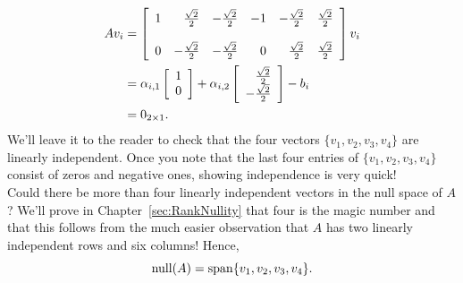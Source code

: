      $$\begin{aligned} A v_i & =  \left[\begin{array}{rrrrrr}  1 & \frac{\sqrt{2}}{2} & -\frac{\sqrt{2}}{2} & -1 & -\frac{\sqrt{2}}{2} & \frac{\sqrt{2}}{2} \bigskip \\
     0& -\frac{\sqrt{2}}{2} & -\frac{\sqrt{2}}{2} & 0 & \frac{\sqrt{2}}{2} & \frac{\sqrt{2}}{2}\end{array} \right] v_i\\
     & =\alpha_{i,1} \left[\begin{array}{r}  1\\ 0 \end{array} \right] + \alpha_{i,2} \left[\begin{array}{r}  \frac{\sqrt{2}}{2}\\ -\frac{\sqrt{2}}{2} \end{array} \right] - b_i \\
     & = 0_{2 \times 1}. \end{aligned}  $$
     We'll leave it to the reader to check that the four vectors $\{v_1, v_2, v_3, v_4\}$ are linearly independent. Once you note that the last four entries of $\{v_1, v_2, v_3, v_4 \}$ consist of zeros and negative ones, showing independence is very quick!\\
     
Could there be more than four linearly independent vectors in the null space of $A$? We'll prove in Chapter~\ref{sec:RankNullity} that four is the magic number and that this follows from the much easier observation that $A$ has two linearly independent rows and six columns! Hence, 
$$ \mathrm{null}(A) = \mathrm{span} \{ v_1, v_2, v_3, v_4 \}.$$
 
 \vspace*{.2cm}    

